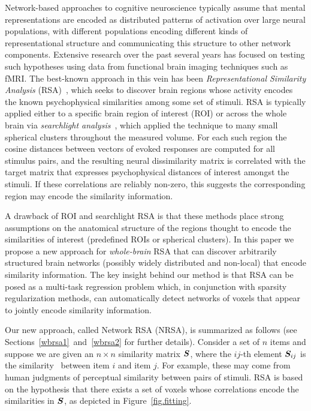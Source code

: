 Network-based approaches to cognitive neuroscience typically assume that mental
representations are encoded as distributed patterns of activation over large neural
populations, with different populations encoding different kinds of representational
structure and communicating this structure to other network components. Extensive research
over the past several years has focused on testing such hypotheses using data from
functional brain imaging techniques such as fMRI. The best-known approach in this vein has
been \emph{Representational Similarity Analysis} (RSA)~\cite{RSA}, which seeks to discover
brain regions whose activity encodes the known psychophysical similarities among some set
of stimuli. RSA is typically applied either to a specific brain region of interest (ROI)
or across the whole brain via {\em searchlight analysis}~\cite{searchlight}, which applied
the technique to many small spherical clusters throughout the measured volume. For each
such region the cosine distances between vectors of evoked responses are computed for all
stimulus pairs, and the resulting neural dissimilarity matrix is correlated with the
target matrix that expresses psychophysical distances of interest amongst the stimuli. If
these correlations are reliably non-zero, this suggests the corresponding region may
encode the similarity information.

A drawback of ROI and searchlight RSA is that these methods place strong assumptions on
the anatomical structure of the regions thought to encode the similarities of interest
(predefined ROIs or spherical clusters). In this paper we propose a new approach for {\em
whole-brain} RSA that can discover arbitrarily structured brain networks (possibly widely
distributed and non-local) that encode similarity information. The key insight behind our
method is that RSA can be posed as a multi-task regression problem which, in conjunction
with sparsity regularization methods, can automatically detect networks of voxels that
appear to jointly encode similarity information.

Our new approach, called Network RSA (NRSA), is summarized as follows (see
Sections~\ref{wbrsa1}~and~\ref{wbrsa2} for further details). Consider a set of $n$ items
and suppose we are given an $n \times n$ similarity matrix $\boldsymbol{S}$, where the $ij$-th
element $\boldsymbol{S}_{ij}$ is the similarity~\cite{similarity} between item $i$ and item $j$. For
example, these may come from human judgments of perceptual similarity between pairs of
stimuli. RSA is based on the hypothesis that there exists a set of voxels whose
correlations encode the similarities in $\boldsymbol{S}$, as depicted in Figure~\ref{fig.fitting}.

